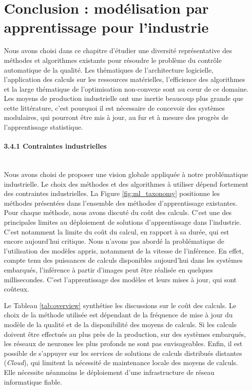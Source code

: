 \section{Conclusion : modélisation par apprentissage pour l'industrie} \label{subsec:metric_learning_conclusion}
Nous avons choisi dans ce chapitre d'étudier une diversité représentative des méthodes et algorithmes existants pour résoudre le problème du contrôle automatique de la qualité.
Les thématiques de l'architecture logicielle, l'application des calculs sur les ressources matérielles, l'efficience des algorithmes et la large thématique de l'optimisation non-convexe sont au cœur de ce domaine.
Les moyens de production industrielle ont une inertie beaucoup plus grande que cette littérature, c'est pourquoi il est nécessaire de concevoir des systèmes modulaires, qui pourront être mis à jour, au fur et à mesure des progrès de l'apprentissage statistique.

\paragraph{3.4.1 Contraintes industrielles} \mbox{} \\
Nous avons choisi de proposer une vision globale appliquée à notre problématique industrielle.
Le choix des méthodes et des algorithmes à utiliser dépend fortement des contraintes industrielles.
La Figure \ref{fig:ml_taxonomy} positionne les méthodes présentées dans l'ensemble des méthodes d'apprentissage existantes.
Pour chaque méthode, nous avons discuté du coût des calculs.
C'est une des principales limites au déploiement de solutions d'apprentissage dans l'industrie.
C'est notamment la limite du coût du calcul, en rapport à sa durée, qui est encore aujourd'hui critique.
Nous n'avons pas abordé la problématique de l'utilisation des modèles appris, notamment de la vitesse de l'inférence.
En effet, compte tenu des puissances de calculs disponibles aujourd'hui dans les systèmes embarqués, l'inférence à partir d'images peut être réalisée en quelques millisecondes.
C'est l'apprentissage des modèles et leurs mises à jour, qui sont coûteux.

Le Tableau \ref{tab:overview} synthétise les discussions sur le coût des calculs.
Le choix de la méthode utilisée est dépendant de la fréquence de mise à jour du modèle de la qualité et de la disponibilité des moyens de calculs.
Si les calculs doivent être effectués au plus près de la production, sur des systèmes embarqués, les réseaux de neurones les plus profonds ne sont pas envisageables.
Enfin, il est possible de s'appuyer sur les services de solutions de calculs distribués distantes (\textit{Cloud}), qui limitent la nécessité de maintenance locale des moyens de calculs.
Elle nécessite néanmoins le déploiement d'une infrastructure de réseau informatique fiable.

